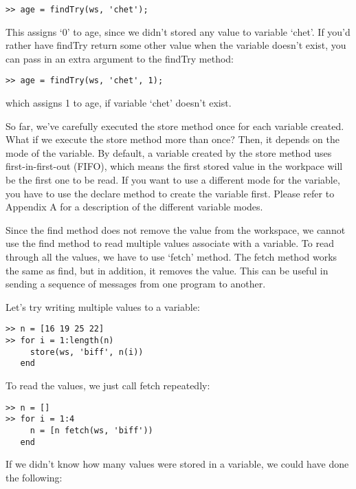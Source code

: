 \begin{verbatim}
>> age = findTry(ws, 'chet');
\end{verbatim}

This assigns `0' to age, since we didn't stored any value to variable
`chet'.  If you'd rather have findTry return some other value when the
variable doesn't exist, you can pass in an extra argument to the findTry
method:

\begin{verbatim}
>> age = findTry(ws, 'chet', 1);
\end{verbatim}

which assigns 1 to age, if variable `chet' doesn't exist.

So far, we've carefully executed the store method once for each variable
created.  What if we execute the store method more than once? Then, it
depends on the mode of the variable. By default, a variable created by
the store method uses first-in-first-out (FIFO), which means the first
stored value in the workpace will be the first one to be read. If you
want to use a different mode for the variable, you have to use the
declare method to create the variable first.  Please refer to
Appendix A for a description of the different variable modes.

Since the find method does not remove the value from the workspace, we cannot
use the find method to read multiple values associate with a variable. To
read through all the values, we have to use `fetch' method.  The fetch
method works the same as find, but in addition, it removes the value.
This can be useful in sending a sequence of messages from one program to
another.

Let's try writing multiple values to a variable:

\begin{samepage}
\begin{verbatim}
>> n = [16 19 25 22]
>> for i = 1:length(n)
     store(ws, 'biff', n(i))
   end
\end{verbatim}
\end{samepage}

To read the values, we just call fetch repeatedly:

\begin{samepage}
\begin{verbatim}
>> n = []
>> for i = 1:4
     n = [n fetch(ws, 'biff'))
   end
\end{verbatim}
\end{samepage}

If we didn't know how many values were stored in a variable, we could
have done the following:

